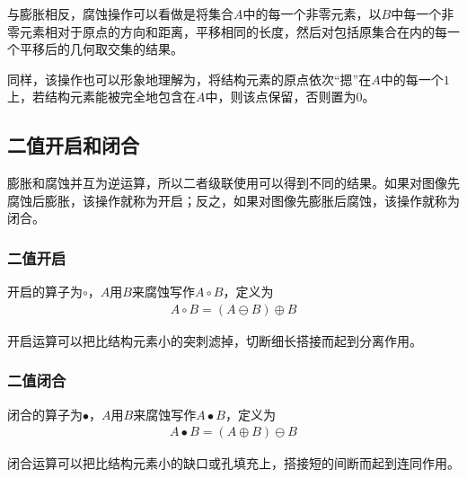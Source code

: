 \documentclass[UTF8]{ctexart}
\begin{document}
                \indent 与膨胀相反，腐蚀操作可以看做是将集合$A$中的每一个非零元素，以$B$中每一个非零元素相对于原点的方向和距离，平移相同的长度，然后对包括原集合在内的每一个平移后的几何取交集的结果。
                
                \indent 同样，该操作也可以形象地理解为，将结构元素的原点依次“摁”在$A$中的每一个$1$上，若结构元素能被完全地包含在$A$中，则该点保留，否则置为$0$。
                
            \subsection{二值开启和闭合}
                
                \indent 膨胀和腐蚀并互为逆运算，所以二者级联使用可以得到不同的结果。如果对图像先腐蚀后膨胀，该操作就称为开启；反之，如果对图像先膨胀后腐蚀，该操作就称为闭合。
                
                \subsubsection{二值开启}
                
                    \indent 开启的算子为$\circ$，$A$用$B$来腐蚀写作$A \circ B$，定义为
                        \begin{align}
                            A \circ B = \left( A \ominus B \right) \oplus B
                        \end{align}                
                
                    \indent 开启运算可以把比结构元素小的突刺滤掉，切断细长搭接而起到分离作用。
            
                \subsubsection{二值闭合}
                
                    \indent 闭合的算子为$\bullet$，$A$用$B$来腐蚀写作$A \bullet B$，定义为
                        \begin{align}
                            A \bullet B = \left( A \oplus B \right) \ominus B 
                        \end{align}           
                
                    \indent 闭合运算可以把比结构元素小的缺口或孔填充上，搭接短的间断而起到连同作用。 
                
\end{document}
